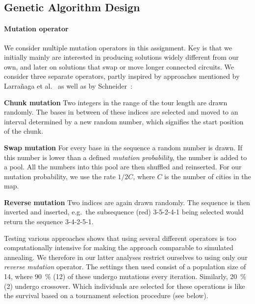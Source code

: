 \documentclass[10pt, twocolumn]{article}\usepackage[]{graphicx}\usepackage[]{color}
\theoremstyle{plain}
\newcommand{\sa}{simulated annealing\xspace}
\begin{document}
  \subsection{Genetic Algorithm Design}
    \paragraph{Mutation operator}
      We consider multiple mutation operators in this assignment. Key is that we initially mainly are interested in producing solutions widely different from our own, and later on solutions that swap or move longer connected circuits. We consider three separate operators, partly inspired by approaches mentioned by Larra{\~{n}}aga et al.~\cite{ga_tsp} as well as by Schneider~\cite{sa_tsp}: 
      \begin{description}
        \item{\bf Chunk mutation} Two integers in the range of the tour length are drawn randomly. The bases in between of these indices are selected and moved to an interval determined by a new random number, which signifies the start position of the chunk.
        \item{\bf Swap mutation} For every base in the sequence a random number is drawn. If this number is lower than a defined \textit{mutation probability}, the number is added to a pool. All the numbers into this pool are then shuffled and reinserted. For our mutation probability, we use the rate $1 / 2C$, where $C$ is the number of cities in the map.
        \item{\bf Reverse mutation} Two indices are again drawn randomly. The sequence is then inverted and inserted, e.g.\ the subsequence (red) 3-{\color{Red}5-2-4}-1 being selected would return the sequence 3-{\color{Red}4-2-5}-1.  
      \end{description}
      
      Testing various approaches shows that using several different operators is too computationally intensive for making the approach comparable to \sa. We therefore in our latter analyses restrict ourselves to using only our \textit{reverse mutation} operator. The settings then used consist of a population size of 14, where 90~\% (12) of these undergo mutations every iteration. Similarly, 20~\% (2) undergo crossover. Which individuals are selected for these operations is like the survival based on a tournament selection procedure (see below).
      
\end{document}
